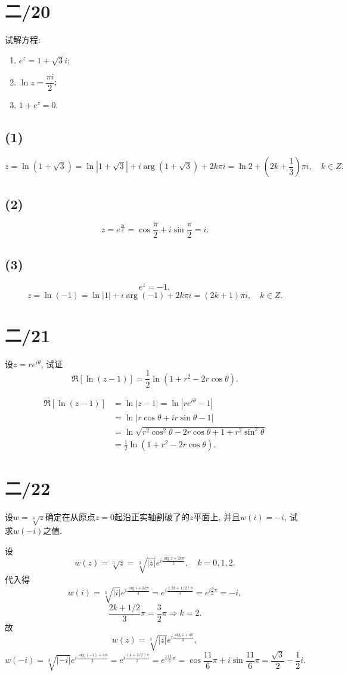 \documentclass[11pt,a4paper]{article}
\begin{document}
\section{二/20}
\begin{problem}
试解方程:
\begin{enumerate}
  \item $e^z=1+\sqrt{3}i$;
  \item $\ln z=\dfrac{\pi i}{2}$;
  \item $1+e^z=0$.
\end{enumerate}
\end{problem}

\subsection*{(1)}
$$z=\ln(1+\sqrt{3})=\ln|1+\sqrt{3}|+i\arg(1+\sqrt{3})+2k\pi i=\ln 2+\left(2k+\frac{1}{3}\right)\pi i,\quad k\in Z.$$

\subsection*{(2)}
$$z=e^{\frac{\pi i}{2}}=\cos\frac{\pi}{2}+i\sin\frac{\pi}{2}=i.$$

\subsection*{(3)}
$$e^z=-1,$$
$$z=\ln(-1)=\ln|1|+i\arg(-1)+2k\pi i=(2k+1)\pi i,\quad k\in Z.$$

\section{二/21}
\begin{problem}
设$z=re^{i\theta}$, 试证
$$\Re[\ln(z-1)]=\frac{1}{2}\ln(1+r^2-2r\cos\theta).$$
\end{problem}
\begin{align*}
  \Re[\ln(z-1)] & =\ln|z-1|=\ln|re^{i\theta}-1|                             \\
                & =\ln|r\cos\theta+ir\sin\theta-1|                          \\
                & =\ln\sqrt{r^2\cos^2\theta-2r\cos\theta+1+r^2\sin^2\theta} \\
                & =\frac{1}{2}\ln(1+r^2-2r\cos\theta).
\end{align*}

\section{二/22}
\begin{problem}
设$w=\sqrt[3]{z}$确定在从原点$z=0$起沿正实轴割破了的$z$平面上, 并且$w(i)=-i$, 试求$w(-i)$之值.
\end{problem}
设
$$w(z)=\sqrt[3]{z}=\sqrt[3]{|z|}e^{i\frac{\arg z+2k\pi}{3}},\quad k=0,1,2.$$
代入得
$$w(i)=\sqrt[3]{|i|}e^{i\frac{\arg i+2k\pi}{3}}=e^{i\frac{(2k+1/2)\pi}{3}}=e^{i\frac{3}{2}\pi}=-i,$$
$$\frac{2k+1/2}{3}\pi=\frac{3}{2}\pi\Longrightarrow k=2.$$
故
$$w(z)=\sqrt[3]{|z|}e^{i\frac{\arg z+4\pi}{3}},$$
$$w(-i)=\sqrt[3]{|-i|}e^{i\frac{\arg(-i)+4\pi}{3}}=e^{i\frac{(4+3/2)\pi}{3}}=e^{i\frac{11}{6}\pi}=\cos\frac{11}{6}\pi+i\sin\frac{11}{6}\pi=\frac{\sqrt{3}}{2}-\frac{1}{2}i.$$
\end{document}
